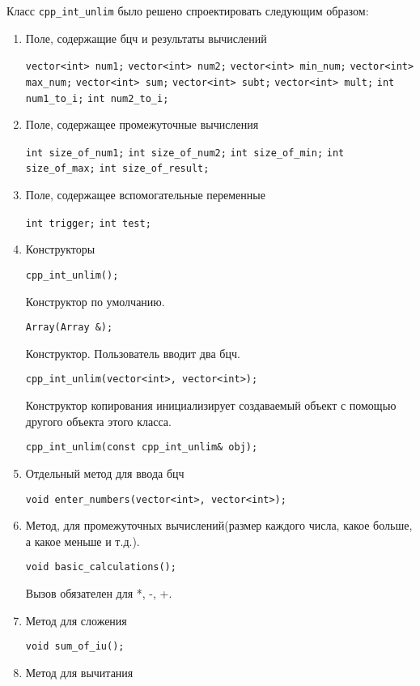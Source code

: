 \documentclass[12pt,a4paper]{report}
\begin{document}
Класс \verb+cpp_int_unlim+ было решено спроектировать следующим образом: 
\begin{enumerate}
 	\item Поле, содержащие бцч и результаты вычислений
 	
 	\verb+vector<int> num1;+
    \verb+vector<int> num2;+
    \verb+vector<int> min_num;+
    \verb+vector<int> max_num;+
    \verb+vector<int> sum;+
    \verb+vector<int> subt;+
    \verb+vector<int> mult;+
    \verb+int num1_to_i;+
    \verb+int num2_to_i;+
		 
	\item Поле, содержащее промежуточные вычисления
	
	\verb+int size_of_num1;+
    \verb+int size_of_num2;+
    \verb+int size_of_min;+
    \verb+int size_of_max;+
    \verb+int size_of_result;+
    
    \item Поле, содержащее вспомогательные переменные
	
	\verb+int trigger;+
    \verb+int test;+
		 
	\item Конструкторы
	
	\verb+cpp_int_unlim();+

	Конструктор по умолчанию.
	
	\verb+Array(Array &);+
	
	Конструктор. Пользователь вводит два бцч.
	
	\verb+cpp_int_unlim(vector<int>, vector<int>);+

	Конструктор копирования инициализирует создаваемый объект с помощью другого объекта этого класса.
	
	\verb+cpp_int_unlim(const cpp_int_unlim& obj);+
	
	\item Отдельный метод для ввода бцч
	
	\verb+void enter_numbers(vector<int>, vector<int>);+
	
	\item Метод, для промежуточных вычислений(размер каждого числа, какое больше, а какое меньше и т.д.).
	
	\verb+void basic_calculations();+
	
	Вызов обязателен для *, -, +.
	
	\item Метод для сложения
	
	\verb+void sum_of_iu();+
	
	\item Метод для вычитания
	

\end{enumerate}
\end{document}

